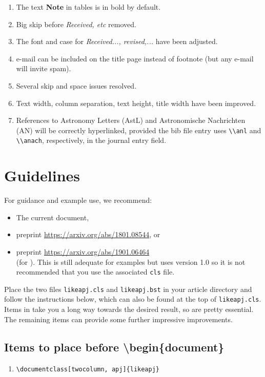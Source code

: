 \documentclass[tighten,twocolumn,useAMS,appendixfloats,apj]{likeapj}
\begin{document}
{{\begin{enumerate}
\item The text {\bf Note} in tables is in bold by default.
\item Big skip before {\it Received, etc} removed.
\item The font and case for {\it Received..., revised,...} have been adjusted.
\item e-mail can be included on the title page instead of footnote (but any e-mail will invite spam).
\item Several skip and space issues resolved.
\item Text width, column separation, text height, title width have been improved.
  \item References to Astronomy Letters (AstL) and Astronomische Nachrichten (AN) will be correctly hyperlinked, provided the bib file entry uses {\tt{\textbackslash\textbackslash}anl} and {\tt{\textbackslash\textbackslash}anach}, respectively, in the journal entry field. 
\end{enumerate}


\section{Guidelines}\label{sec-guide}
For guidance and example use, we recommend:
\begin{itemize}
\itemsep-3pt 
\item The current document,
\item preprint \href{https://arxiv.org/abs/1801.08544}{https://arxiv.org/abs/1801.08544}, or
\item preprint \href{https://arxiv.org/abs/1901.06464}{https://arxiv.org/abs/1901.06464} \\(for \citet{tzanavaris2018}). This is still adequate for examples but uses version 1.0 so it is not recommended that you use the associated {\tt cls} file.
\end{itemize}


Place the two files {\tt likeapj.cls} and {\tt likeapj.bst} in your article directory and follow the instructions below, which can also be found at the top of {\tt likeapj.cls}. Items in  take you a long way towards the desired result, so are pretty essential. The remaining items can provide some further impressive improvements.

\subsection{Items to place before {\textbackslash}begin\{document\}}\label{sec-befdoc}
\begin{enumerate}
\item  {\tt {\textbackslash}documentclass[twocolumn, apj]\{likeapj\}}
  

\end{enumerate}}}
\end{document}
